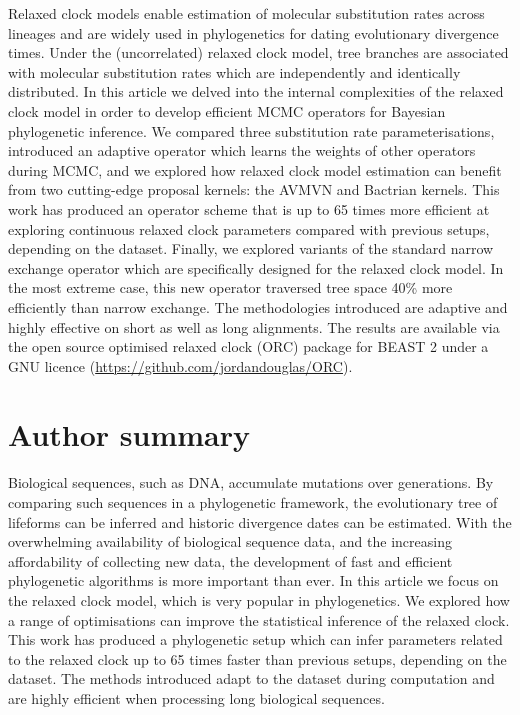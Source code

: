 \documentclass[10pt,letterpaper]{article}
\begin{document}
Relaxed clock models enable estimation of molecular substitution rates across lineages and are widely used in phylogenetics for dating evolutionary divergence times.
Under the (uncorrelated) relaxed clock model, tree branches are associated with molecular substitution rates which are independently and identically distributed.
In this article we delved into the internal complexities of the relaxed clock model in order to develop efficient MCMC operators for Bayesian phylogenetic inference.
We compared three substitution rate parameterisations, introduced an adaptive operator which learns the weights of other operators during MCMC, and we explored how relaxed clock model estimation can benefit from two cutting-edge proposal kernels: the AVMVN and Bactrian kernels.
This work has produced an operator scheme that is up to 65 times more efficient at exploring continuous relaxed clock parameters compared with previous setups, depending on the dataset. 
Finally, we explored variants of the standard narrow exchange operator which are specifically designed for the relaxed clock model.
In the most extreme case, this new operator traversed tree space 40\% more efficiently than narrow exchange.
The methodologies introduced are adaptive and highly effective on short as well as long alignments.
The results are available via the open source optimised relaxed clock (ORC) package for BEAST 2 under a GNU licence (\url{https://github.com/jordandouglas/ORC}).

\section*{Author summary}

Biological sequences, such as DNA, accumulate mutations over generations. 
By comparing such sequences in a phylogenetic framework, the evolutionary tree of lifeforms can be inferred and historic divergence dates can be estimated.
With the overwhelming availability of biological sequence data, and the increasing affordability of collecting new data, the development of fast and efficient phylogenetic algorithms is more important than ever.
In this article we focus on the relaxed clock model, which is very popular in phylogenetics.
We explored how a range of optimisations can improve the statistical inference of the relaxed clock.
This work has produced a phylogenetic setup which can infer parameters related to the relaxed clock up to 65 times faster than previous setups, depending on the dataset. 
The methods introduced adapt to the dataset during computation and are highly efficient when processing long biological sequences.    
\end{document}
